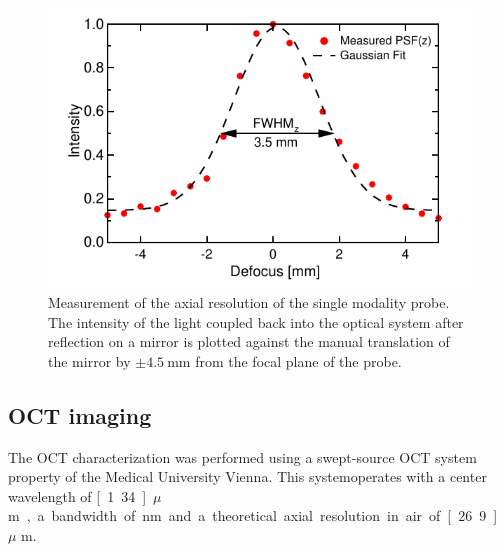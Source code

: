 \documentclass[10pt]{iopart}
\begin{document}
\begin{figure}[h!]\centering \includegraphics[width=\columnwidth]{figures/PSFz.pdf}
      \caption{Measurement of the axial resolution of the single modality probe. The intensity of the light coupled back into the optical system after reflection on a mirror is plotted against the manual translation of the mirror by $\pm \SI{4.5}{\milli\meter}$ from the focal plane of the probe. }
      \label{fig:FWHM}
\end{figure}




\subsection{OCT imaging}

The OCT characterization was performed using a swept-source OCT system property of the Medical University Vienna. This systemoperates with a center wavelength of \unit[1.34]{$\mu$ m}, a bandwidth of \unit[37]{nm} and a theoretical axial resolution in air of \unit[26.9]{$\mu$ m}.
\end{document}
